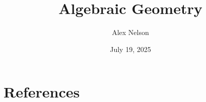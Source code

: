 \documentclass{book}
\title{Algebraic Geometry}
\author{Alex Nelson}
\date{July 19, 2025}
\begin{document}
\frontmatter
\maketitle



\tableofcontents

\mainmatter

















\chapter*{References}


\end{document}
